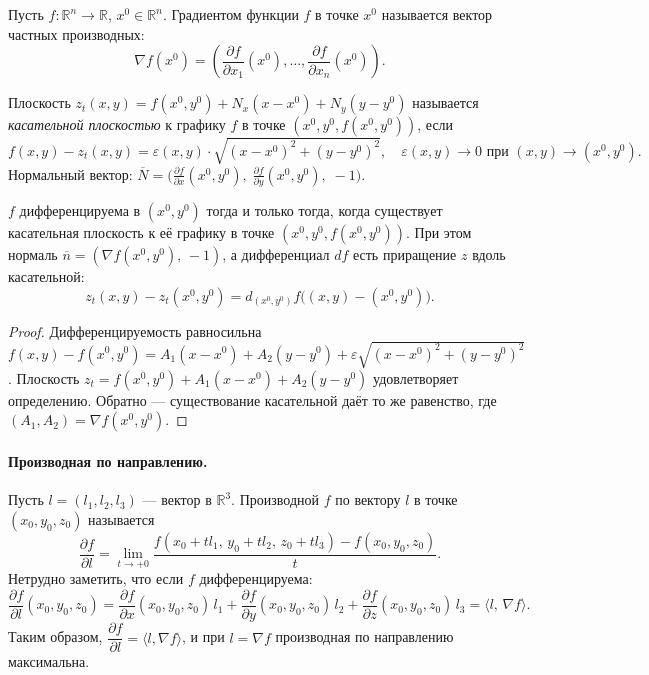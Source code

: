 


\begin{defn}[Градиент]
  Пусть $f : \mathbb{R}^n \to \mathbb{R}$, $x^0 \in \mathbb{R}^n$.
  Градиентом функции $f$ в точке $x^0$ называется вектор частных производных:
  \[
    \nabla f(x^0)
    = \left(\frac{\partial f}{\partial x_1}(x^0), \ldots,
             \frac{\partial f}{\partial x_n}(x^0)\right).
  \]
\end{defn}

\begin{defn}
  Плоскость $z_t(x,y) = f(x^0,y^0) + N_x(x-x^0) + N_y(y-y^0)$
  называется \emph{касательной плоскостью} к графику $f$ в точке $(x^0, y^0, f(x^0,y^0))$, если
  \[
    f(x,y) - z_t(x,y) = \varepsilon(x,y)\cdot\sqrt{(x-x^0)^2+(y-y^0)^2},
    \quad \varepsilon(x,y) \to 0 \text{ при } (x,y) \to (x^0,y^0).
  \]
  Нормальный вектор: $\overline{N} = \bigl(\tfrac{\partial f}{\partial x}(x^0,y^0),\;
  \tfrac{\partial f}{\partial y}(x^0,y^0),\; -1\bigr)$.
\end{defn}

\begin{theorem}
  $f$ дифференцируема в $(x^0,y^0)$ тогда и только тогда, когда существует
  касательная плоскость к её графику в точке $(x^0, y^0, f(x^0,y^0))$.
  При этом нормаль $\overline{n} = (\nabla f(x^0,y^0),\,-1)$,
  а дифференциал $df$ есть приращение $z$ вдоль касательной:
  \[
    z_t(x,y) - z_t(x^0,y^0) = d_{(x^0,y^0)}f\bigl((x,y)-(x^0,y^0)\bigr).
  \]
  \begin{proof}
    Дифференцируемость равносильна $f(x,y) - f(x^0,y^0) = A_1(x-x^0) + A_2(y-y^0)
    + \varepsilon\sqrt{(x-x^0)^2+(y-y^0)^2}$. Плоскость
    $z_t = f(x^0,y^0) + A_1(x-x^0) + A_2(y-y^0)$ удовлетворяет определению.
    Обратно --- существование касательной даёт то же равенство, где $(A_1,A_2) = \nabla f(x^0,y^0)$. \qedhere
  \end{proof}
\end{theorem}

\paragraph{Производная по направлению.}
Пусть $l = (l_1, l_2, l_3)$ --- вектор в $\mathbb{R}^3$.
Производной $f$ по вектору $l$ в точке $(x_0,y_0,z_0)$ называется
\[
  \frac{\partial f}{\partial l} = \lim_{t \to +0}
  \frac{f(x_0+tl_1,\,y_0+tl_2,\,z_0+tl_3) - f(x_0,y_0,z_0)}{t}.
\]
Нетрудно заметить, что если $f$ дифференцируема:
\[
  \frac{\partial f}{\partial l}(x_0,y_0,z_0)
  = \frac{\partial f}{\partial x}(x_0,y_0,z_0)\,l_1
  + \frac{\partial f}{\partial y}(x_0,y_0,z_0)\,l_2
  + \frac{\partial f}{\partial z}(x_0,y_0,z_0)\,l_3
  = \langle l,\, \nabla f \rangle.
\]
Таким образом, $\dfrac{\partial f}{\partial l} = \langle l, \nabla f \rangle$, и при $l = \nabla f$ производная по направлению максимальна.

